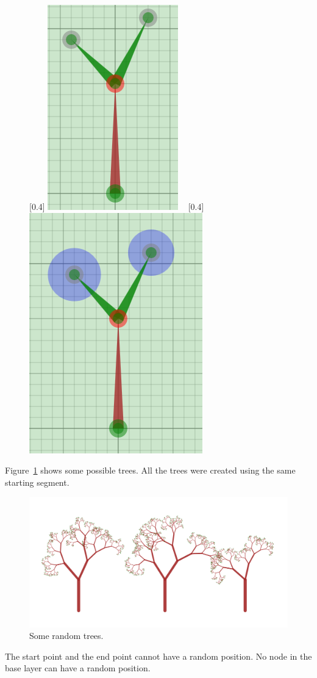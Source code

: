 		\begin{figure}[H]
			\centering
			[0.4\textwidth]
				{\includegraphics[height=0.3\textwidth]{img/Randomness/Node/ran_tree_01.png}}
			~
			[0.4\textwidth]
				{\includegraphics[height=0.3\textwidth]{img/Randomness/Node/ran_tree_02.png}}
		\end{figure}

		Figure~\ref{ran_tree_03} shows some possible trees.
		All the trees were created using the same starting segment.

		\begin{figure}[H]
			\centering
			\caption{\label{ran_tree_03} Some random trees.}
			\includegraphics[width=0.9\TW]{img/Randomness/Node/ran_tree_03.png}
		\end{figure}

		The start point and the end point cannot have a random position.
		No node in the base layer can have a random position.

